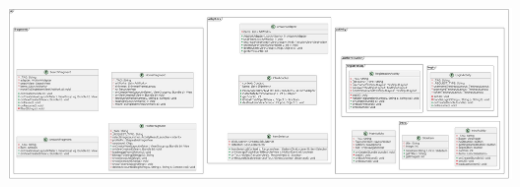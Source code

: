 \begin{center}
            \includegraphics[width=19cm, height=19cm, keepaspectratio]{content/img/ui.png}
      \end{center}
